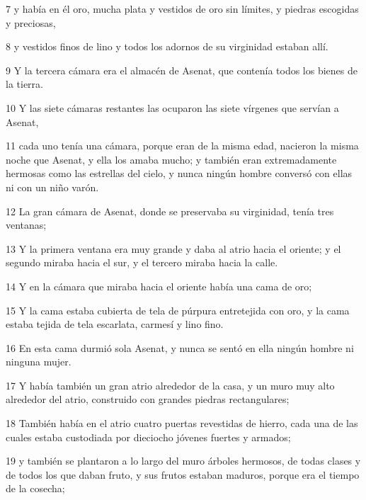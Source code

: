 \par 7 y había en él oro, mucha plata y vestidos de oro sin límites, y piedras escogidas y preciosas,

\par 8 y vestidos finos de lino y todos los adornos de su virginidad estaban allí.

\par 9 Y la tercera cámara era el almacén de Asenat, que contenía todos los bienes de la tierra.

\par 10 Y las siete cámaras restantes las ocuparon las siete vírgenes que servían a Asenat,

\par 11 cada uno tenía una cámara, porque eran de la misma edad, nacieron la misma noche que Asenat, y ella los amaba mucho; y también eran extremadamente hermosas como las estrellas del cielo, y nunca ningún hombre conversó con ellas ni con un niño varón.

\par 12 La gran cámara de Asenat, donde se preservaba su virginidad, tenía tres ventanas;

\par 13 Y la primera ventana era muy grande y daba al atrio hacia el oriente; y el segundo miraba hacia el sur, y el tercero miraba hacia la calle.

\par 14 Y en la cámara que miraba hacia el oriente había una cama de oro;

\par 15 Y la cama estaba cubierta de tela de púrpura entretejida con oro, y la cama estaba tejida de tela escarlata, carmesí y lino fino.

\par 16 En esta cama durmió sola Asenat, y nunca se sentó en ella ningún hombre ni ninguna mujer.

\par 17 Y había también un gran atrio alrededor de la casa, y un muro muy alto alrededor del atrio, construido con grandes piedras rectangulares;

\par 18 También había en el atrio cuatro puertas revestidas de hierro, cada una de las cuales estaba custodiada por dieciocho jóvenes fuertes y armados;

\par 19 y también se plantaron a lo largo del muro árboles hermosos, de todas clases y de todos los que daban fruto, y sus frutos estaban maduros, porque era el tiempo de la cosecha;

